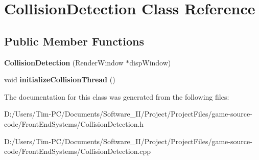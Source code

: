 \hypertarget{class_collision_detection}{}\section{Collision\+Detection Class Reference}
\label{class_collision_detection}
\subsection*{Public Member Functions}
\begin{DoxyCompactItemize}
\item 
\mbox{\label{class_collision_detection_a3f9bc79550f37b2c929dfef9ea1a82e3}} 
{\bfseries Collision\+Detection} (Render\+Window $\ast$disp\+Window)
\item 
\mbox{\label{class_collision_detection_ad100d45a6884ee0b9e714833af04553c}} 
void {\bfseries initialize\+Collision\+Thread} ()
\end{DoxyCompactItemize}


The documentation for this class was generated from the following files\+:\begin{DoxyCompactItemize}
\item 
D\+:/\+Users/\+Tim-\/\+P\+C/\+Documents/\+Software\+\_\+\+I\+I/\+Project/\+Project\+Files/game-\/source-\/code/\+Front\+End\+Systems/Collision\+Detection.\+h\item 
D\+:/\+Users/\+Tim-\/\+P\+C/\+Documents/\+Software\+\_\+\+I\+I/\+Project/\+Project\+Files/game-\/source-\/code/\+Front\+End\+Systems/Collision\+Detection.\+cpp\end{DoxyCompactItemize}
